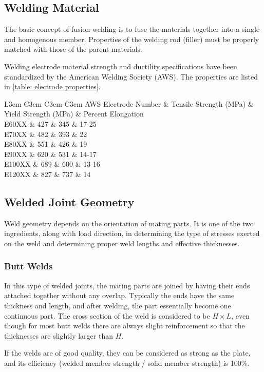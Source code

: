 \documentclass[a4paper,openany,nobib]{tufte-book}
\begin{document}
{{\subsection{Welding Material}
\label{welding-material}
The basic concept of fusion welding is to fuse the materials together
into a single and homogenous member. Properties of the welding rod
(filler) must be properly matched with those of the parent materials.

Welding electrode material strength and ductility specifications have
been standardized by the American Welding Society (AWS). The properties
are listed in \ref{table: electrode properties}.


 L3cm C3cm C3cm C3cm AWS Electrode Number \& Tensile Strength (MPa) \&
Yield Strength (MPa) \& Percent Elongation\\
E60XX \& 427 \& 345 \& 17-25\\
E70XX \& 482 \& 393 \& 22\\
E80XX \& 551 \& 426 \& 19\\
E90XX \& 620 \& 531 \& 14-17\\
E100XX \& 689 \& 600 \& 13-16\\
E120XX \& 827 \& 737 \& 14\\

\subsection{Welded Joint Geometry}
\label{welded-joint-geometry}
Weld geometry depends on the orientation of mating parts. It is one of
the two ingredients, along with load direction, in determining the type
of stresses exerted on the weld and determining proper weld lengths and
effective thicknesses.

\subsubsection{Butt Welds}
\label{butt-welds}
In this type of welded joints, the mating parts are joined by having
their ends attached together without any overlap. Typically the ends
have the same thickness and length, and after welding, the part
essentially become one continuous part. The cross section of the weld is
considered to be \(H \times L\), even though for most butt welds there are
always slight reinforcement so that the thicknesses are slightly larger
than \(H\).


If the welds are of good quality, they can be considered as strong as
the plate, and its efficiency (welded member strength / solid member
strength) is 100\%.

}}
\end{document}
